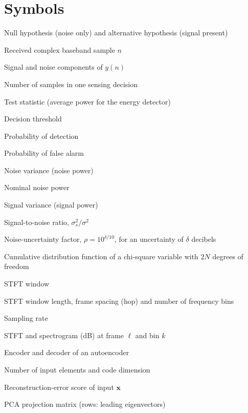 \section*{Symbols}
\begin{description}[style=sameline, leftmargin=3.6cm, labelwidth=3.3cm, font=\normalfont, itemsep=0pt]
  \item[$\mathcal{H}_0$, $\mathcal{H}_1$] Null hypothesis (noise only) and alternative hypothesis (signal present)
  \item[$y(n)$]     Received complex baseband sample $n$
  \item[$s(n)$, $w(n)$] Signal and noise components of $y(n)$
  \item[$N$]        Number of samples in one sensing decision
  \item[$T$]        Test statistic (average power for the energy detector)
  \item[$\lambda$]  Decision threshold
  \item[$\Pd$]  Probability of detection
  \item[$\Pfa$] Probability of false alarm
  \item[$\sigma^2$] Noise variance (noise power)
  \item[$\sigma_n^2$] Nominal noise power
  \item[$\sigma_s^2$] Signal variance (signal power)
  \item[$\gamma$]   Signal-to-noise ratio, $\sigma_s^2/\sigma^2$
  \item[$\rho$, $\delta$] Noise-uncertainty factor, $\rho = 10^{\delta/10}$, for an uncertainty of $\delta$ decibels
  \item[$F_{\chi^2_{2N}}$] Cumulative distribution function of a chi-square variable with $2N$ degrees of freedom
  \item[$h(m)$]     STFT window
  \item[$L$, $R$, $K$] STFT window length, frame spacing (hop) and number of frequency bins
  \item[$f_s$]      Sampling rate
  \item[$X(\ell, k)$, $S(\ell, k)$] STFT and spectrogram (dB) at frame $\ell$ and bin $k$
  \item[$f$, $g$]   Encoder and decoder of an autoencoder
  \item[$D$, $d$]   Number of input elements and code dimension
  \item[$e(\mathbf{x})$] Reconstruction-error score of input $\mathbf{x}$
  \item[$\mathbf{W}$] PCA projection matrix (rows: leading eigenvectors)

\end{description}
